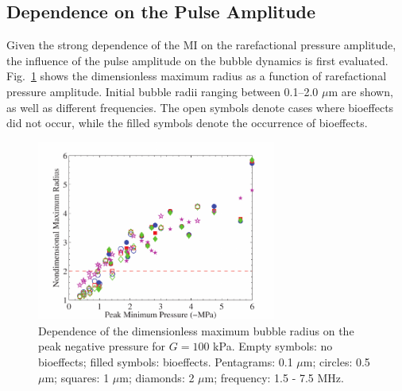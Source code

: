 \subsection{Dependence on the Pulse Amplitude}

Given the strong dependence of the MI on the rarefactional pressure
amplitude, the influence of the pulse amplitude on the bubble dynamics
is first evaluated. Fig.~\ref{fig:amplitude} shows the dimensionless
maximum radius as a function of rarefactional pressure
amplitude. Initial bubble radii ranging between 0.1--2.0 $\mu$m are
shown, as well as different frequencies. The open symbols denote
cases where bioeffects did not occur, while the filled symbols denote
the occurrence of bioeffects.

\begin{figure}[t]
  \centering
  \includegraphics[width=0.7\textwidth]{figs/bubble_figs/Rstarmax_Pm}
  \caption{Dependence of the dimensionless maximum
    bubble radius on the peak negative pressure for $G=100$ kPa.
    Empty symbols: no bioeffects; filled symbols:
    bioeffects. Pentagrams: 0.1 $\mu$m; circles: 0.5 $\mu$m; squares:
    1 $\mu$m; diamonds: 2 $\mu$m; frequency: 1.5 - 7.5 MHz. }
  \label{fig:amplitude}
\end{figure}

